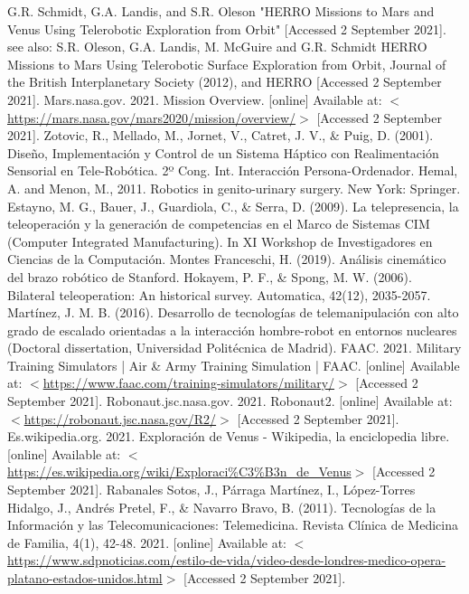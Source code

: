 \begin{thebibliography}{2}
	 G.R. Schmidt, G.A. Landis, and S.R. Oleson "HERRO Missions to Mars and Venus Using Telerobotic Exploration from Orbit" [Accessed 2 September 2021]. see also: S.R. Oleson, G.A. Landis, M. McGuire and G.R. Schmidt HERRO Missions to Mars Using Telerobotic Surface Exploration from Orbit, Journal of the British Interplanetary Society (2012), and HERRO  [Accessed 2 September 2021].
	 Mars.nasa.gov. 2021. Mission Overview. [online] Available at: $<$\url{https://mars.nasa.gov/mars2020/mission/overview/}$>$ [Accessed 2 September 2021].
	 Zotovic, R., Mellado, M., Jornet, V., Catret, J. V., \& Puig, D. (2001). Diseño, Implementación y Control de un Sistema Háptico con Realimentación Sensorial en Tele-Robótica. 2º Cong. Int. Interacción Persona-Ordenador.
	 Hemal, A. and Menon, M., 2011. Robotics in genito-urinary surgery. New York: Springer.
	 Estayno, M. G., Bauer, J., Guardiola, C., \& Serra, D. (2009). La telepresencia, la teleoperación y la generación de competencias en el Marco de Sistemas CIM (Computer Integrated Manufacturing). In XI Workshop de Investigadores en Ciencias de la Computación.
	 Montes Franceschi, H. (2019). Análisis cinemático del brazo robótico de Stanford.
	 Hokayem, P. F., \& Spong, M. W. (2006). Bilateral teleoperation: An historical survey. Automatica, 42(12), 2035-2057.
	 Martínez, J. M. B. (2016). Desarrollo de tecnologías de telemanipulación con alto grado de escalado orientadas a la interacción hombre-robot en entornos nucleares (Doctoral dissertation, Universidad Politécnica de Madrid).
	 FAAC. 2021. Military Training Simulators | Air \& Army Training Simulation | FAAC. [online] Available at: $<$\url{https://www.faac.com/training-simulators/military/}$>$ [Accessed 2 September 2021].
	 Robonaut.jsc.nasa.gov. 2021. Robonaut2. [online] Available at: $<$\url{https://robonaut.jsc.nasa.gov/R2/}$>$ [Accessed 2 September 2021].
	 Es.wikipedia.org. 2021. Exploración de Venus - Wikipedia, la enciclopedia libre. [online] Available at: $<$\url{https://es.wikipedia.org/wiki/Exploraci\%C3\%B3n\_de\_Venus}$>$ [Accessed 2 September 2021].
	 Rabanales Sotos, J., Párraga Martínez, I., López-Torres Hidalgo, J., Andrés Pretel, F., \& Navarro Bravo, B. (2011). Tecnologías de la Información y las Telecomunicaciones: Telemedicina. Revista Clínica de Medicina de Familia, 4(1), 42-48.
	 2021. [online] Available at: $<$\href{https://www.sdpnoticias.com/estilo-de-vida/video-desde-londres-medico-opera-platano-estados-unidos.html}{https://www.sdpnoticias.com/estilo-de-vida/video-desde-londres-medico-opera-platano-estados-unidos.html}$>$ [Accessed 2 September 2021].

\end{thebibliography}
